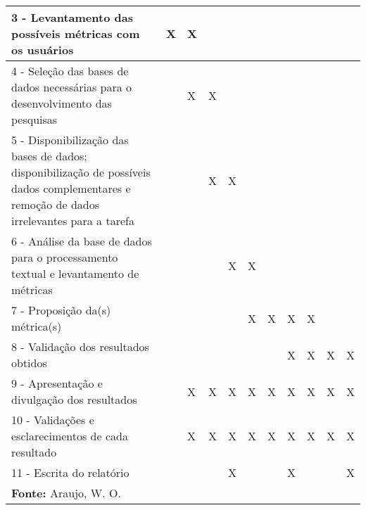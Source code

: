 \begin{longtable}[c]{|p{7cm}|llllllllll|}
3 - Levantamento das possíveis métricas com os usuários & \multicolumn{1}{l|}{X} & \multicolumn{1}{l|}{X} & \multicolumn{1}{l|}{} & \multicolumn{1}{l|}{} & \multicolumn{1}{l|}{} & \multicolumn{1}{l|}{} & \multicolumn{1}{l|}{} & \multicolumn{1}{l|}{} & \multicolumn{1}{l|}{} &  \\ \hline
4 - Seleção das bases de dados necessárias para o desenvolvimento das pesquisas & \multicolumn{1}{l|}{} & \multicolumn{1}{l|}{X} & \multicolumn{1}{l|}{X} & \multicolumn{1}{l|}{} & \multicolumn{1}{l|}{} & \multicolumn{1}{l|}{} & \multicolumn{1}{l|}{} & \multicolumn{1}{l|}{} & \multicolumn{1}{l|}{} &  \\ \hline
5 - Disponibilização das bases de dados; disponibilização de possíveis dados complementares e remoção de dados irrelevantes para a tarefa & \multicolumn{1}{l|}{} & \multicolumn{1}{l|}{} & \multicolumn{1}{l|}{X} & \multicolumn{1}{l|}{X} & \multicolumn{1}{l|}{} & \multicolumn{1}{l|}{} & \multicolumn{1}{l|}{} & \multicolumn{1}{l|}{} & \multicolumn{1}{l|}{} &  \\ \hline
6 - Análise da base de dados para o processamento textual e levantamento de métricas & \multicolumn{1}{l|}{} & \multicolumn{1}{l|}{} & \multicolumn{1}{l|}{} & \multicolumn{1}{l|}{X} & \multicolumn{1}{l|}{X} & \multicolumn{1}{l|}{} & \multicolumn{1}{l|}{} & \multicolumn{1}{l|}{} & \multicolumn{1}{l|}{} &  \\ \hline
7 - Proposição da(s) métrica(s) & \multicolumn{1}{l|}{} & \multicolumn{1}{l|}{} & \multicolumn{1}{l|}{} & \multicolumn{1}{l|}{} & \multicolumn{1}{l|}{X} & \multicolumn{1}{l|}{X} & \multicolumn{1}{l|}{X} & \multicolumn{1}{l|}{X} & \multicolumn{1}{l|}{} &  \\ \hline
8 - Validação dos resultados obtidos & \multicolumn{1}{l|}{} & \multicolumn{1}{l|}{} & \multicolumn{1}{l|}{} & \multicolumn{1}{l|}{} & \multicolumn{1}{l|}{} & \multicolumn{1}{l|}{} & \multicolumn{1}{l|}{X} & \multicolumn{1}{l|}{X} & \multicolumn{1}{l|}{X} & X \\ \hline
9 - Apresentação e divulgação dos resultados & \multicolumn{1}{l|}{} & \multicolumn{1}{l|}{X} & \multicolumn{1}{l|}{X} & \multicolumn{1}{l|}{X} & \multicolumn{1}{l|}{X} & \multicolumn{1}{l|}{X} & \multicolumn{1}{l|}{X} & \multicolumn{1}{l|}{X} & \multicolumn{1}{l|}{X} & X \\ \hline
10 - Validações e esclarecimentos de cada resultado & \multicolumn{1}{l|}{} & \multicolumn{1}{l|}{X} & \multicolumn{1}{l|}{X} & \multicolumn{1}{l|}{X} & \multicolumn{1}{l|}{X} & \multicolumn{1}{l|}{X} & \multicolumn{1}{l|}{X} & \multicolumn{1}{l|}{X} & \multicolumn{1}{l|}{X} & X \\ \hline
11 - Escrita do relatório & \multicolumn{1}{l|}{} & \multicolumn{1}{l|}{} & \multicolumn{1}{l|}{} & \multicolumn{1}{l|}{X} & \multicolumn{1}{l|}{} & \multicolumn{1}{l|}{} & \multicolumn{1}{l|}{X} & \multicolumn{1}{l|}{} & \multicolumn{1}{l|}{} & X \\ \hline
\multicolumn{11}{l}{\textbf{Fonte:} Araujo, W. O.}
\end{longtable}

